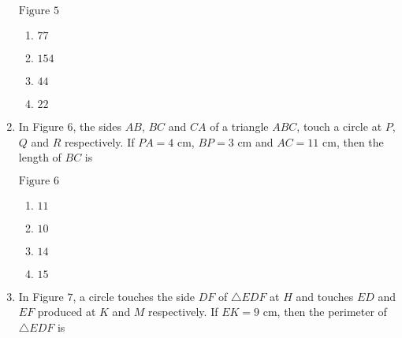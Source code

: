 \documentclass[journal,12pt,onecolumn]{IEEEtran}
\theoremstyle{remark}
\begin{document}
\begin{enumerate}
\begin{figure}[ht]
\begin{tikzpicture}[scale = 1.4, rotate=10]
\end{tikzpicture}
\end{figure}
\begin{center}
$\text{Figure } 5$
\end{center}
\begin{enumerate}
\item $77$ 
\item $154$ 
\item $44$ 
\item $22$ 
\end{enumerate}
\item In Figure $6$, the sides $AB$, $BC$ and $CA$ of a triangle $ABC$, touch a circle at $P$, $Q$ and $R$ respectively. If $PA = 4\text{ cm}$, $BP = 3\text{ cm}$ and $AC = 11\text{ cm}$, then the length of $BC$  is
\begin{figure}[ht]
\centering
{}
\end{figure}
\begin{center}
$\text{Figure } 6$
\end{center}
\begin{enumerate}
\item $11$ 
\item $10$ 
\item $14$ 
\item $15$ 
\end{enumerate}
\item In Figure $7$, a circle touches the side $DF$ of $\triangle EDF$ at $H$ and touches $ED$ and $EF$ produced at $K$ and $M$ respectively. If $EK = 9\text{ cm}$, then the perimeter of $\triangle EDF$  is
\begin{figure}[ht]
\centering
\begin{tikzpicture}[scale=0.75]


\end{tikzpicture}
\end{figure}
\end{enumerate}
\end{document}
